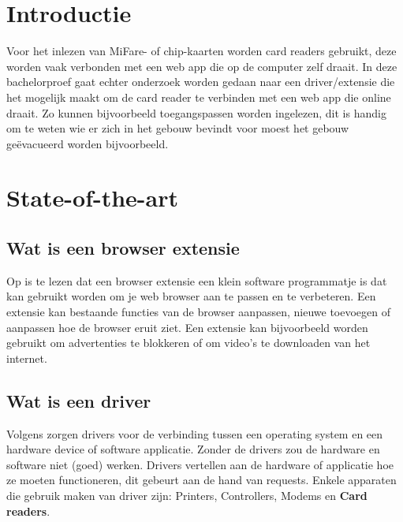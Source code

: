 \documentclass{hogent-article}
\affiliation{
  \textsuperscript{1} \href{mailto:wout.demaeseneer@student.hogent.be}{mailto:wout.demaeseneer@student.hogent.be}}
\begin{document}
\flushbottom %
\maketitle %
\tableofcontents %
\thispagestyle{empty} %


\section{Introductie}
Voor het inlezen van MiFare- of chip-kaarten worden card readers gebruikt, deze worden vaak verbonden met een web app die op de computer zelf draait. In deze bachelorproef gaat echter onderzoek worden gedaan naar een driver/extensie die het mogelijk maakt om de card reader te verbinden met een web app die online draait. Zo kunnen bijvoorbeeld toegangspassen worden ingelezen, dit is handig om te weten wie er zich in het gebouw bevindt voor moest het gebouw geëvacueerd worden bijvoorbeeld.

\section{State-of-the-art}

\subsection{Wat is een browser extensie}
Op \textcite{Desktop.com} is te lezen dat een browser extensie een klein software programmatje is dat kan gebruikt worden om je web browser aan te passen en te verbeteren. Een extensie kan bestaande functies van de browser aanpassen, nieuwe toevoegen of aanpassen hoe de browser eruit ziet.
Een extensie kan bijvoorbeeld worden gebruikt om advertenties te blokkeren of om video's te downloaden van het internet.

\subsection{Wat is een driver}
Volgens \textcite{Webopedia} zorgen drivers voor de verbinding tussen een operating system en een hardware device of software applicatie. Zonder de drivers zou de hardware en software niet (goed) werken. Drivers vertellen aan de hardware of applicatie hoe ze moeten functioneren, dit gebeurt aan de hand van requests. Enkele apparaten die gebruik maken van driver zijn: Printers, Controllers, Modems en \textbf{Card readers}.
\end{document}
